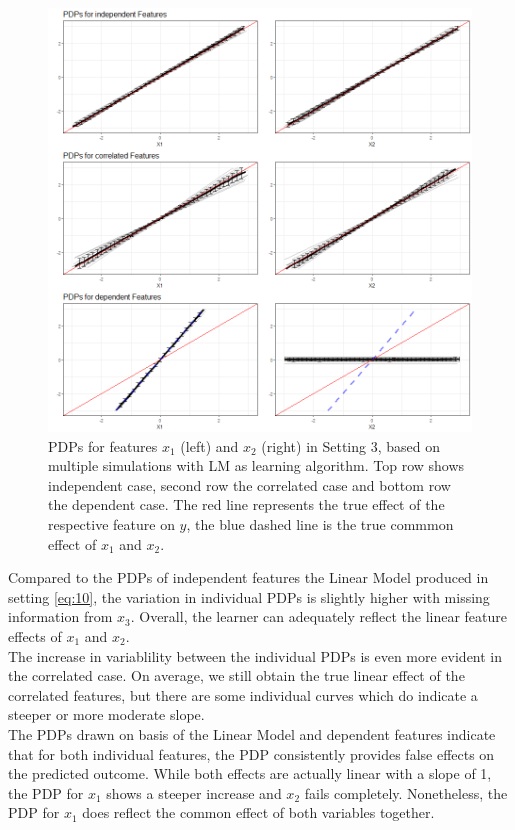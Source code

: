 \documentclass[]{krantz}
\begin{document}
\begin{figure}

\includegraphics[width=1\linewidth]{images/VK_PDP_19_Set3_LM} \hfill{}

\caption{PDPs for features $x_1$ (left) and $x_2$  (right) in Setting 3, based on multiple simulations with LM as learning algorithm. Top row shows independent case, second row the correlated case and bottom row the dependent case. The red line represents the true effect of the respective feature on $y$, the blue dashed line is the true commmon effect of $x_1$ and $x_2$.}\label{fig:Figure19}
\end{figure}

Compared to the PDPs of independent features the Linear Model produced
in setting \eqref{eq:10}, the variation in individual PDPs is slightly
higher with missing information from \(x_3\). Overall, the learner can
adequately reflect the linear feature effects of \(x_1\) and \(x_2\).\\
The increase in variablility between the individual PDPs is even more
evident in the correlated case. On average, we still obtain the true
linear effect of the correlated features, but there are some individual
curves which do indicate a steeper or more moderate slope.\\
The PDPs drawn on basis of the Linear Model and dependent features
indicate that for both individual features, the PDP consistently
provides false effects on the predicted outcome. While both effects are
actually linear with a slope of 1, the PDP for \(x_1\) shows a steeper
increase and \(x_2\) fails completely. Nonetheless, the PDP for \(x_1\)
does reflect the common effect of both variables together.
\end{document}
